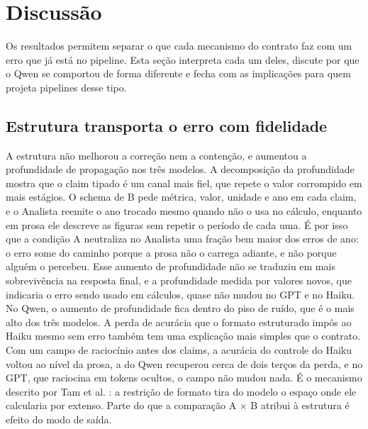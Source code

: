 \section{Discussão}\label{sec:discussao}

Os resultados permitem separar o que cada mecanismo do contrato faz com um erro que já está no pipeline.
Esta seção interpreta cada um deles, discute por que o Qwen se comportou de forma diferente e fecha com as implicações para quem projeta pipelines desse tipo.

\subsection{Estrutura transporta o erro com fidelidade}\label{sec:disc-estrutura}

A estrutura não melhorou a correção nem a contenção, e aumentou a profundidade de propagação nos três modelos.
A decomposição da profundidade mostra que o claim tipado é um canal mais fiel, que repete o valor corrompido em mais estágios.
O schema de B pede métrica, valor, unidade e ano em cada claim, e o Analista reemite o ano trocado mesmo quando não o usa no cálculo, enquanto em prosa ele descreve as figuras sem repetir o período de cada uma.
É por isso que a condição A neutraliza no Analista uma fração bem maior dos erros de ano: o erro some do caminho porque a prosa não o carrega adiante, e não porque alguém o percebeu.
Esse aumento de profundidade não se traduziu em mais sobrevivência na resposta final, e a profundidade medida por valores novos, que indicaria o erro sendo usado em cálculos, quase não mudou no GPT e no Haiku. No Qwen, o aumento de profundidade fica dentro do piso de ruído, que é o mais alto dos três modelos.
A perda de acurácia que o formato estruturado impôs ao Haiku mesmo sem erro também tem uma explicação mais simples que o contrato. Com um campo de raciocínio antes dos claims, a acurácia do controle do Haiku voltou ao nível da prosa, a do Qwen recuperou cerca de dois terços da perda, e no GPT, que raciocina em tokens ocultos, o campo não mudou nada. É o mecanismo descrito por Tam et al. \cite{tam2024speak}: a restrição de formato tira do modelo o espaço onde ele calcularia por extenso. Parte do que a comparação A $\times$ B atribui à estrutura é efeito do modo de saída.


